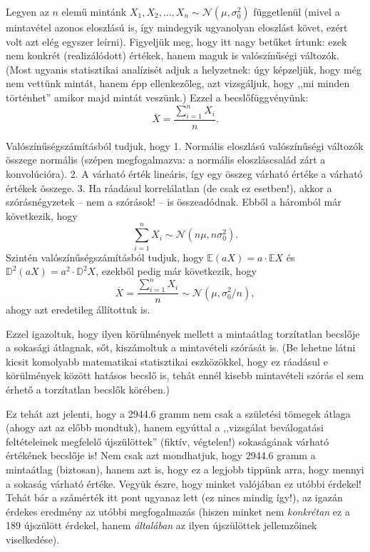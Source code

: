 \documentclass[
]{book}
\begin{document}
Legyen az \(n\) elemű mintánk \(X_1,X_2,\ldots,X_n\sim\mathcal{N}\left(\mu,\sigma_0^2\right)\) függetlenül (mivel a mintavétel azonos eloszlású is, így mindegyik ugyanolyan eloszlást követ, ezért volt azt elég egyszer leírni). Figyeljük meg, hogy itt nagy betűket írtunk: ezek nem konkrét (realizálódott) értékek, hanem maguk is valószínűségi változók. (Most ugyanis statisztikai analízisét adjuk a helyzetnek: úgy képzeljük, hogy még nem vettünk mintát, hanem épp ellenkezőleg, azt vizsgáljuk, hogy ,,mi minden történhet'' amikor majd mintát veszünk.) Ezzel a becslőfüggvényünk:
\[
    \overline{X}=\frac{\sum_{i=1}^n X_i}{n}.
\]

Valószínűségszámításból tudjuk, hogy
1. Normális eloszlású valószínűségi változók összege normális (szépen megfogalmazva: a normális eloszláscsalád zárt a konvolúcióra).
2. A várható érték lineáris, így egy összeg várható értéke a várható értékek összege.
3. Ha ráadásul korrelálatlan (de csak ez esetben!), akkor a szórásnégyzetek -- nem a szórások! -- is összeadódnak.
Ebből a háromból már következik, hogy
\[
    \sum_{i=1}^n X_i\sim\mathcal{N}\left(n\mu,n\sigma_0^2\right).
\]
Szintén valószínűségszámításból tudjuk, hogy \(\mathbb{E}\left(aX\right)=a \cdot \mathbb{E}X\) és \(\mathbb{D}^2\left(aX\right)=a^2 \cdot \mathbb{D}^2 X\), ezekből pedig már következik, hogy
\[
    \overline{X}=\frac{\sum_{i=1}^n X_i}{n} \sim \mathcal{N}\left(\mu,\sigma_0^2/n\right),
\]
ahogy azt eredetileg állítottuk is.

Ezzel igazoltuk, hogy ilyen körülmények mellett a mintaátlag torzítatlan becslője a sokasági átlagnak, sőt, kiszámoltuk a mintavételi szórását is. (Be lehetne látni kicsit komolyabb matematikai statisztikai eszközökkel, hogy ez ráadásul e körülmények között hatásos becslő is, tehát ennél kisebb mintavételi szórás el sem érhető a torzítatlan becslők körében.)

Ez tehát azt jelenti, hogy a 2944.6 gramm nem csak a születési tömegek átlaga (ahogy azt az előbb mondtuk), hanem egyúttal a ,,vizsgálat beválogatási feltételeinek megfelelő újszülöttek'' (fiktív, végtelen!) sokaságának várható értékének becslője is! Nem csak azt mondhatjuk, hogy 2944.6 gramm a mintaátlag (biztosan), hanem azt is, hogy ez a legjobb tippünk arra, hogy mennyi a sokaság várható értéke. Vegyük észre, hogy minket valójában ez utóbbi érdekel! Tehát bár a számérték itt pont ugyanaz lett (ez nincs mindig így!), az igazán érdekes eredmény az utóbbi megfogalmazás (hiszen minket nem \emph{konkrétan} ez a 189 újszülött érdekel, hanem \emph{általában} az ilyen újszülöttek jellemzőinek viselkedése).
\end{document}
